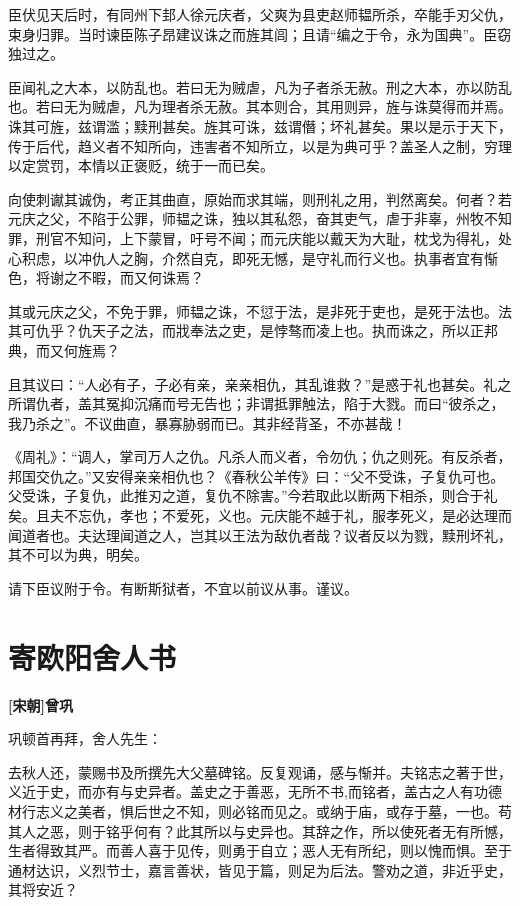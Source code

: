 \documentclass[UTF8,titlepage,oneside]{ctexbook}
\begin{document}
臣伏见天后时，有同州下邽人徐元庆者，父爽为县吏赵师韫所杀，卒能手刃父仇，束身归罪。当时谏臣陈子昂建议诛之而旌其闾；且请“编之于令，永为国典”。臣窃独过之。


臣闻礼之大本，以防乱也。若曰无为贼虐，凡为子者杀无赦。刑之大本，亦以防乱也。若曰无为贼虐，凡为理者杀无赦。其本则合，其用则异，旌与诛莫得而并焉。诛其可旌，兹谓滥；黩刑甚矣。旌其可诛，兹谓僭；坏礼甚矣。果以是示于天下，传于后代，趋义者不知所向，违害者不知所立，以是为典可乎？盖圣人之制，穷理以定赏罚，本情以正褒贬，统于一而已矣。


向使刺谳其诚伪，考正其曲直，原始而求其端，则刑礼之用，判然离矣。何者？若元庆之父，不陷于公罪，师韫之诛，独以其私怨，奋其吏气，虐于非辜，州牧不知罪，刑官不知问，上下蒙冒，吁号不闻；而元庆能以戴天为大耻，枕戈为得礼，处心积虑，以冲仇人之胸，介然自克，即死无憾，是守礼而行义也。执事者宜有惭色，将谢之不暇，而又何诛焉？


其或元庆之父，不免于罪，师韫之诛，不愆于法，是非死于吏也，是死于法也。法其可仇乎？仇天子之法，而戕奉法之吏，是悖骜而凌上也。执而诛之，所以正邦典，而又何旌焉？


且其议曰：“人必有子，子必有亲，亲亲相仇，其乱谁救？”是惑于礼也甚矣。礼之所谓仇者，盖其冤抑沉痛而号无告也；非谓抵罪触法，陷于大戮。而曰“彼杀之，我乃杀之”。不议曲直，暴寡胁弱而已。其非经背圣，不亦甚哉！


《周礼》：“调人，掌司万人之仇。凡杀人而义者，令勿仇；仇之则死。有反杀者，邦国交仇之。”又安得亲亲相仇也？《春秋公羊传》曰：“父不受诛，子复仇可也。父受诛，子复仇，此推刃之道，复仇不除害。”今若取此以断两下相杀，则合于礼矣。且夫不忘仇，孝也；不爱死，义也。元庆能不越于礼，服孝死义，是必达理而闻道者也。夫达理闻道之人，岂其以王法为敌仇者哉？议者反以为戮，黩刑坏礼，其不可以为典，明矣。


请下臣议附于令。有断斯狱者，不宜以前议从事。谨议。



\chapter*{寄欧阳舍人书}
\begin{center}
	\textbf{[宋朝]曾巩}
\end{center}


巩顿首再拜，舍人先生：


去秋人还，蒙赐书及所撰先大父墓碑铭。反复观诵，感与惭并。夫铭志之著于世，义近于史，而亦有与史异者。盖史之于善恶，无所不书,而铭者，盖古之人有功德材行志义之美者，惧后世之不知，则必铭而见之。或纳于庙，或存于墓，一也。苟其人之恶，则于铭乎何有？此其所以与史异也。其辞之作，所以使死者无有所憾，生者得致其严。而善人喜于见传，则勇于自立；恶人无有所纪，则以愧而惧。至于通材达识，义烈节士，嘉言善状，皆见于篇，则足为后法。警劝之道，非近乎史，其将安近？
\end{document}
